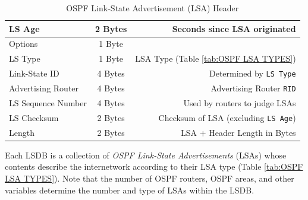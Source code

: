 \documentclass[12pt]{article}
\begin{document}
	\begin{table}[H]
	\centering
	\caption{OSPF Link-State Advertisement (LSA) Header \label{tab:OSPF LSA}}
	\begin{tabular}{| l | c | r |}
	\hline
	LS Age			& 2 Bytes	& Seconds since LSA originated\\\hline
	Options			& 1 Byte	&\\\hline
	LS Type			& 1 Byte	& LSA Type (Table \ref{tab:OSPF LSA TYPES})\\\hline
	Link-State ID		& 4 Bytes	& Determined by \texttt{LS Type}\\\hline
	Advertising Router	& 4 Bytes	& Advertising Router \texttt{RID}\\\hline
	LS Sequence Number	& 4 Bytes	& Used by routers to judge LSAs\\\hline
	LS Checksum		& 2 Bytes	& Checksum of LSA (excluding \texttt{LS Age})\\\hline
	Length			& 2 Bytes	& LSA + Header Length in Bytes\\\hline
	\end{tabular}\end{table}
	Each LSDB is a collection of \textit{OSPF Link-State Advertisements} (LSAs) whose contents describe the internetwork according to their LSA type (Table \ref{tab:OSPF LSA TYPES}). Note that the number of OSPF routers, OSPF areas, and other variables determine the number and type of LSAs within the LSDB.
\end{document}
